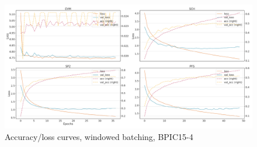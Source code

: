 \begin{figure}[!htb]
    \centering
    \includegraphics[width=\textwidth]{gfx/bpic2015_4/windowed_loss_acc_curve.png}
    \caption{Accuracy/loss curves, windowed batching, BPIC15-4}
\end{figure}
\FloatBarrier


